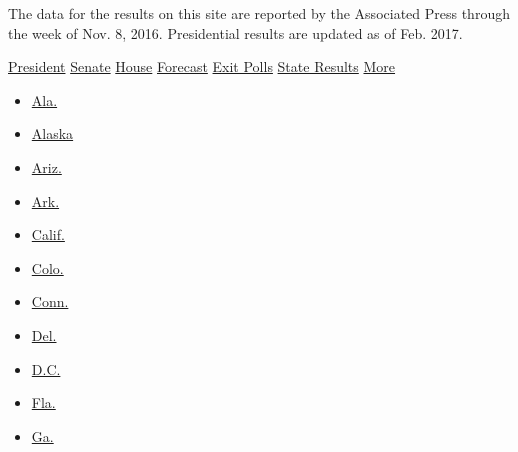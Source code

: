 The data for the results on this site are reported by the Associated
Press through the week of Nov. 8, 2016. Presidential results are updated
as of Feb. 2017.

\href{//www.nytimes3xbfgragh.onion/elections/2016/results/president}{President}
\href{//www.nytimes3xbfgragh.onion/elections/2016/results/senate}{Senate}
\href{//www.nytimes3xbfgragh.onion/elections/2016/results/house}{House}
\href{//www.nytimes3xbfgragh.onion/elections/2016/forecast/president}{Forecast}
\href{//www.nytimes3xbfgragh.onion/interactive/2016/11/08/us/politics/election-exit-polls.html}{Exit
Polls} \href{//www.nytimes3xbfgragh.onion/elections\#}{State Results}
\href{//www.nytimes3xbfgragh.onion/elections\#}{More}

\begin{itemize}
\tightlist
\item
  \href{//www.nytimes3xbfgragh.onion/elections/2016/results/alabama}{Ala.}
\item
  \href{//www.nytimes3xbfgragh.onion/elections/2016/results/alaska}{Alaska}
\item
  \href{//www.nytimes3xbfgragh.onion/elections/2016/results/arizona}{Ariz.}
\item
  \href{//www.nytimes3xbfgragh.onion/elections/2016/results/arkansas}{Ark.}
\item
  \href{//www.nytimes3xbfgragh.onion/elections/2016/results/california}{Calif.}
\item
  \href{//www.nytimes3xbfgragh.onion/elections/2016/results/colorado}{Colo.}
\item
  \href{//www.nytimes3xbfgragh.onion/elections/2016/results/connecticut}{Conn.}
\item
  \href{//www.nytimes3xbfgragh.onion/elections/2016/results/delaware}{Del.}
\item
  \href{//www.nytimes3xbfgragh.onion/elections/2016/results/district-of-columbia}{D.C.}
\item
  \href{//www.nytimes3xbfgragh.onion/elections/2016/results/florida}{Fla.}
\item
  \href{//www.nytimes3xbfgragh.onion/elections/2016/results/georgia}{Ga.}
\end{itemize}

